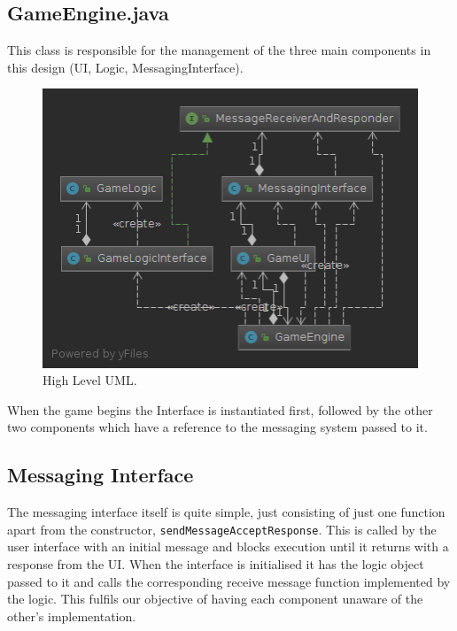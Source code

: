 \documentclass[a4paper, 11pt]{article}
\begin{document}
	\subsection*{GameEngine.java}
	This class is responsible for the management of the three main components in this design (UI, Logic, MessagingInterface). 
	\begin{figure}[!h]
		\centering
		\includegraphics[scale=.45]{uml/messaging_system_uml}
		\caption{High Level UML.}
		\label{fig:high_level_uml}
	\end{figure}
	When the game begins the Interface is instantiated first, followed by the other two components which have a reference to the messaging system passed to it.
		
	\subsection*{Messaging Interface}
	The messaging interface itself is quite simple, just consisting of just one function apart from the constructor, \texttt{sendMessageAcceptResponse}. This is called by the user interface with an initial message and blocks execution until it returns with a response from the UI. When the interface is initialised it has the logic object passed to it and calls the corresponding receive message function implemented by the logic. This fulfils our objective of having each component unaware of the other's implementation. %
	
\end{document}
